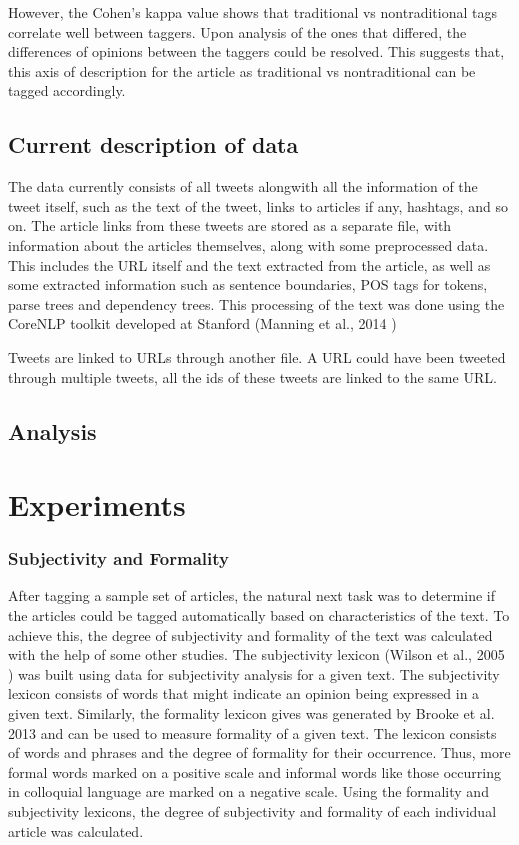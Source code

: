 \documentclass[11pt]{article}
\begin{document}
However, the Cohen’s kappa value shows that traditional vs nontraditional tags correlate well between taggers. Upon analysis of the ones that differed, the differences of opinions between the taggers could be resolved. This suggests that, this axis of description for the article as traditional vs nontraditional can be tagged accordingly.

\section {Current description of data}

The data currently consists of all tweets alongwith all the information of the tweet itself, such as the text of the tweet, links to articles if any, hashtags, and so on. The article links from these tweets are stored as a separate file, with information about the articles themselves, along with some preprocessed data. This includes the URL itself and the text extracted from the article, as well as some extracted information such as sentence boundaries, POS tags for tokens, parse trees and dependency trees. This processing of the text was done using the CoreNLP toolkit developed at Stanford (Manning et al., 2014 \cite{manning2014stanford})

Tweets are linked to URLs through another file. A URL could have been tweeted through multiple tweets, all the ids of these tweets are linked to the same URL. 




\section{Analysis}
\chapter {Experiments}

\subsection{Subjectivity and Formality }

After tagging a sample set of articles, the natural next task was to determine if the articles could be tagged automatically based on characteristics of the text. To achieve this, the degree of subjectivity and formality of the text was calculated with the help of some other studies. The subjectivity lexicon (Wilson et al., 2005 \cite{wilson2005recognizing}) was built using data for subjectivity analysis for a given text. The subjectivity lexicon consists of words that might indicate an opinion being expressed in a given text. Similarly, the formality lexicon gives was generated by Brooke et al. 2013 \cite{brooke2013multi} and can be used to measure formality of a given text. The lexicon consists of words and phrases and the degree of formality for their occurrence. Thus, more formal words marked on a positive scale and informal words like those occurring in colloquial language are marked on a negative scale. Using the formality and subjectivity lexicons, the degree of subjectivity and formality of each individual article was calculated. 
\end{document}
